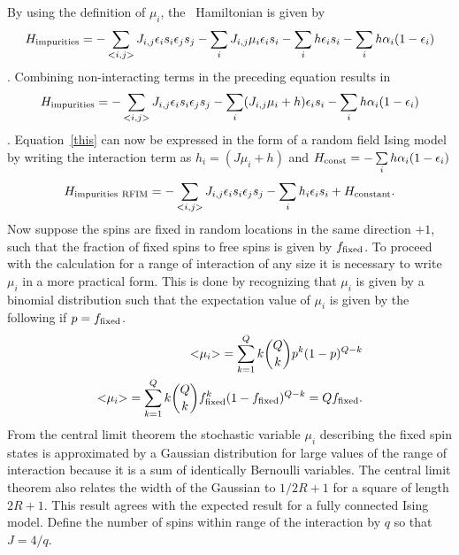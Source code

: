 By using the definition of $\mu_i$, the \het\ Hamiltonian is given by     %
\begin{eqnarray}
H_{\rm impurities} = -\sum\limits_{{<}i,j{>}} J_{i,j} \epsilon_i s_i \epsilon_j s_j 
-\sum\limits_{i} J_{i,j}  \mu_i \epsilon_i s_i -\sum\limits_{i} h \epsilon_i s_i 
-\sum\limits_{i} h \alpha_i (1-\epsilon_i) 
\end{eqnarray}
.
Combining non-interacting terms in the preceding equation results in %
\begin{eqnarray}
H_{\rm impurities} = -\sum\limits_{{<}i,j{>}} J_{i,j} \epsilon_i s_i \epsilon_j s_j 
-\sum\limits_{i} (J_{i,j}  \mu_i + h) \epsilon_i s_i 
-\sum\limits_{i} h \alpha_i (1-\epsilon_i) \label{this}
\end{eqnarray} 
.
Equation~\eqref{this} can now be expressed   in the form of a random field Ising model  by writing the interaction term as $h_i = (J \mu_i + h)$ and $H_{\rm const} = -\sum\limits_{i} h \alpha_i (1-\epsilon_i) $  %
\begin{equation}
	\label{eq:heter_w_field}
H_{\rm{impurities\ RFIM}} = -\sum\limits_{{<}i,j{>}} J_{i,j} \epsilon_i s_i \epsilon_j s_j 
-\sum\limits_{i} h_i \epsilon_i s_i 
+H_{\rm constant} .
\end{equation} %
Now suppose the spins are fixed in random locations in the same direction $+1$, such that the fraction of fixed spins to free spins is given by $f_{\rm fixed}$. 
To proceed with the calculation for a range of interaction of any size it is necessary to write $\mu_i$ in a more practical form. This is done by recognizing that $\mu_i$ is given by a binomial distribution such that the expectation value of $\mu_i$ is given by the following if $p = f_{\rm fixed}$.  %
\begin{eqnarray}
{<}\mu_i {>} =  \sum_{k=1}^Q k \binom {Q} {k} p^k (1-p)^{Q-k} \\
{<}\mu_i {>} =  \sum_{k=1}^Q k \binom {Q} {k} f_{\rm fixed}^k (1-f_{\rm fixed})^{Q-k}  = Q f_{\rm fixed}.
\end{eqnarray}%
From the central limit theorem the stochastic variable $\mu_i$ describing the fixed spin states is approximated by a Gaussian distribution for large values of the range of interaction because it is a sum of identically Bernoulli variables. The central limit theorem also relates the width of the Gaussian to $1/2R+1$
for a square of length $2R+1$. This result agrees with the expected result for a fully connected Ising model. Define the number of spins within range of the interaction by $q$ so that $J= 4/q$. %
